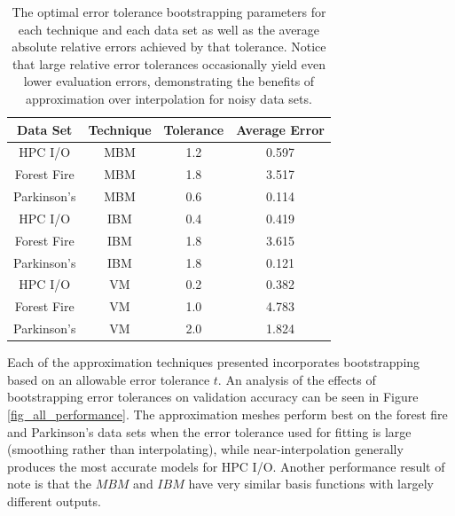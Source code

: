 \begin{table}
  \centering
  \begin{tabular}{c|c|c|c}
    \hline
    \textbf{Data Set} & \textbf{Technique} & \textbf{Tolerance} & \textbf{Average Error}\\
    \hline
    HPC I/O & MBM & 1.2 & 0.597\\
    Forest Fire & MBM & 1.8 & 3.517\\
    Parkinson's & MBM & 0.6 & 0.114\\
    \hline
    HPC I/O & IBM & 0.4 & 0.419\\
    Forest Fire & IBM & 1.8 & 3.615\\
    Parkinson's & IBM & 1.8 & 0.121\\
    \hline
    HPC I/O & VM & 0.2 & 0.382\\
    Forest Fire & VM & 1.0 & 4.783\\
    Parkinson's & VM & 2.0 & 1.824\\
    \hline
  \end{tabular}
  \caption{The optimal error tolerance bootstrapping parameters for each technique and each data set as well as the average absolute relative errors achieved by that tolerance. Notice that large relative error tolerances occasionally yield even lower evaluation errors, demonstrating the benefits of approximation over interpolation for noisy data sets.
  \vspace{-.5cm}}
  \label{tab_optimal_tolerance}
\end{table}

Each of the approximation techniques presented incorporates bootstrapping based on an allowable error tolerance $t$. An analysis of the effects of bootstrapping error tolerances on validation accuracy can be seen in Figure \ref{fig_all_performance}. The approximation meshes perform best on the forest fire and Parkinson's data sets when the error tolerance used for fitting is large (smoothing rather than interpolating), while near-interpolation generally produces the most accurate models for HPC I/O. Another performance result of note is that the $MBM$ and $IBM$ have very similar basis functions with largely different outputs.

